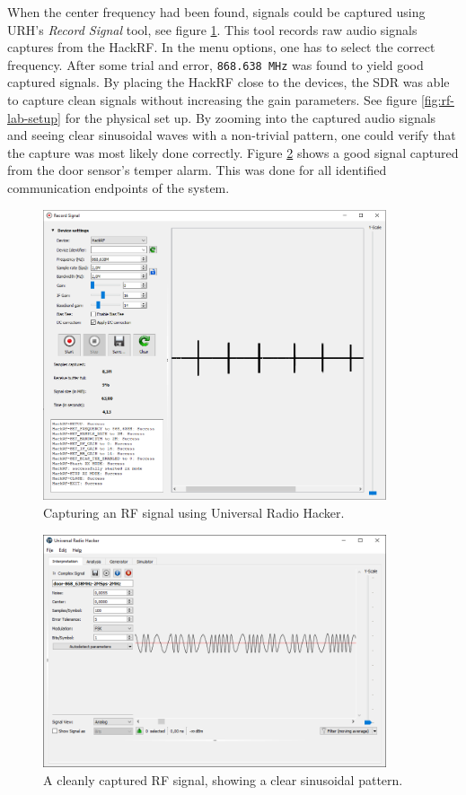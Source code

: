 When the center frequency had been found, signals could be captured using URH's \textit{Record Signal} tool, see figure \ref{fig:rf-signal-capture}. This tool records raw audio signals captures from the HackRF. In the menu options, one has to select the correct frequency. After some trial and error, \texttt{868.638 MHz} was found to yield good captured signals. By placing the HackRF close to the devices, the SDR was able to capture clean signals without increasing the gain parameters. See figure \ref{fig:rf-lab-setup} for the physical set up. By zooming into the captured audio signals and seeing clear sinusoidal waves with a non-trivial pattern, one could verify that the capture was most likely done correctly. Figure \ref{fig:zoomed-in-signal} shows a good signal captured from the door sensor's temper alarm. This was done for all identified communication endpoints of the system.
\begin{figure}[!ht]
    \centering
    \includegraphics[width=0.9\textwidth]{images/6-pentesting/signal-capture.png}
    \caption{Capturing an RF signal using Universal Radio Hacker.}
    \label{fig:rf-signal-capture}
\end{figure}
\begin{figure}[!ht]
    \centering
    \includegraphics[width=0.9\textwidth]{images/6-pentesting/zoomed-in-signal.png}
    \caption{A cleanly captured RF signal, showing a clear sinusoidal pattern.}
    \label{fig:zoomed-in-signal}
\end{figure}

